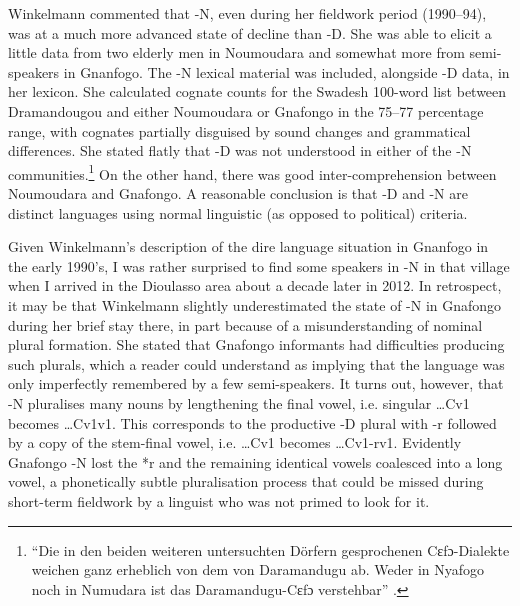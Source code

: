 \documentclass[output=paper,
modfonts
]{langscibook}
\begin{document}
Winkelmann commented that -N, even during her fieldwork period (1990--94), was at a much more advanced state of decline than -D. She was able to elicit a little data from two elderly men in Noumoudara and somewhat more from semi-speakers in Gnanfogo. The -N lexical material was included, alongside -D data, in her lexicon. She calculated cognate counts for the Swadesh 100-word list between Dramandougou and either Noumoudara or Gnafongo in the 75--77 percentage range, with cognates partially disguised by sound changes and grammatical differences. She stated flatly that -D was not understood in either of the -N communities.\footnote{“Die in den beiden weiteren untersuchten Dörfern gesprochenen Cɛfɔ-Dialekte weichen ganz erheblich von dem von Daramandugu ab. Weder in Nyafogo noch in Numudara ist das Daramandugu-Cɛfɔ verstehbar” \citep[5]{Winkelmann1998}.} On the other hand, there was good inter-comprehension between Noumoudara and Gnafongo. A reasonable conclusion is that -D and -N are distinct languages using normal linguistic (as opposed to political) criteria.

Given Winkelmann’s description of the dire language situation in Gnanfogo in the early 1990’s, I was rather surprised to find some speakers in -N in that village when I arrived in the  Dioulasso area about a decade later in 2012. In retrospect, it may be that Winkelmann slightly underestimated the state of -N in Gnafongo during her brief stay there, in part because of a misunderstanding of nominal plural formation. She stated that Gnafongo informants had difficulties producing such plurals, which a reader could understand as implying that the language was only imperfectly remembered by a few semi-speakers. It turns out, however, that -N pluralises many nouns by lengthening the final vowel, i.e.  singular …Cv1 becomes …Cv1v1. This corresponds to the productive -D plural with -r followed by a copy of the stem-final vowel, i.e. …Cv1 becomes …Cv1-rv1. Evidently Gnafongo -N lost the *r and the remaining identical vowels coalesced into a long vowel, a phonetically subtle pluralisation process that could be missed during short-term fieldwork by a linguist who was not primed to look for it.
\end{document}
